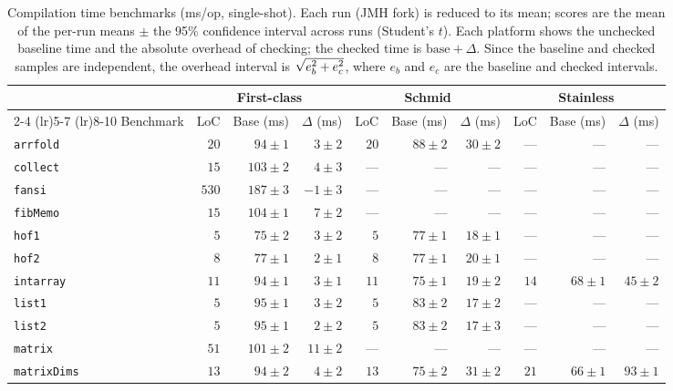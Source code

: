 \begin{table}[t]
\centering
\captionsetup{font=small}
\caption{Compilation time benchmarks (ms/op, single-shot). Each run (JMH fork) is reduced to its mean; scores are the mean of the per-run means $\pm$ the 95\% confidence interval across runs (Student's $t$). Each platform shows the unchecked baseline time and the absolute overhead of checking; the checked time is $\text{base} + \Delta$. Since the baseline and checked samples are independent, the overhead interval is $\sqrt{\smash[b]{e_b^2 + e_c^2}}$, where $e_b$ and $e_c$ are the baseline and checked intervals.}
\label{tab:bench-table}
\footnotesize
\begin{tabular}{l rrr rrr rrr}
\toprule
 & \multicolumn{3}{c}{First-class} & \multicolumn{3}{c}{Schmid} & \multicolumn{3}{c}{Stainless} \\
\cmidrule(lr){2-4} \cmidrule(lr){5-7} \cmidrule(lr){8-10} 
Benchmark & LoC & Base (ms) & $\Delta$ (ms) & LoC & Base (ms) & $\Delta$ (ms) & LoC & Base (ms) & $\Delta$ (ms) \\
\midrule
\texttt{arrfold} & $20$ & $94 \pm 1$ & $3 \pm 2$ & $20$ & $88 \pm 2$ & $30 \pm 2$ & --- & --- & --- \\
\texttt{collect} & $15$ & $103 \pm 2$ & $4 \pm 3$ & --- & --- & --- & --- & --- & --- \\
\texttt{fansi} & $530$ & $187 \pm 3$ & $-1 \pm 3$ & --- & --- & --- & --- & --- & --- \\
\texttt{fibMemo} & $15$ & $104 \pm 1$ & $7 \pm 2$ & --- & --- & --- & --- & --- & --- \\
\texttt{hof1} & $5$ & $75 \pm 2$ & $3 \pm 2$ & $5$ & $77 \pm 1$ & $18 \pm 1$ & --- & --- & --- \\
\texttt{hof2} & $8$ & $77 \pm 1$ & $2 \pm 1$ & $8$ & $77 \pm 1$ & $20 \pm 1$ & --- & --- & --- \\
\texttt{intarray} & $11$ & $94 \pm 1$ & $3 \pm 1$ & $11$ & $75 \pm 1$ & $19 \pm 2$ & $14$ & $68 \pm 1$ & $45 \pm 2$ \\
\texttt{list1} & $5$ & $95 \pm 1$ & $3 \pm 2$ & $5$ & $83 \pm 2$ & $17 \pm 2$ & --- & --- & --- \\
\texttt{list2} & $5$ & $95 \pm 1$ & $2 \pm 2$ & $5$ & $83 \pm 2$ & $17 \pm 3$ & --- & --- & --- \\
\texttt{matrix} & $51$ & $101 \pm 2$ & $11 \pm 2$ & --- & --- & --- & --- & --- & --- \\
\texttt{matrixDims} & $13$ & $94 \pm 2$ & $4 \pm 2$ & $13$ & $75 \pm 2$ & $31 \pm 2$ & $21$ & $66 \pm 1$ & $93 \pm 1$ \\

\end{tabular}
\end{table}
